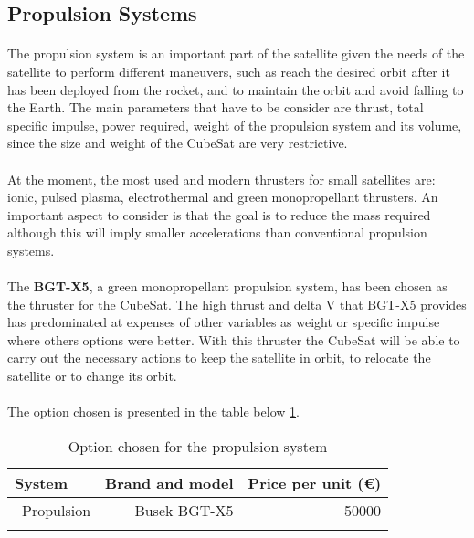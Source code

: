 \subsection{Propulsion Systems}
\paragraph{}The propulsion system is an important part of the satellite given the needs of the satellite to perform different maneuvers, such as reach the desired orbit after it has been deployed from the rocket, and to maintain the orbit and avoid falling to the Earth. The main parameters that have to be consider are thrust, total specific impulse, power required, weight of the propulsion system and its volume, since the size and weight of the CubeSat are very restrictive.

\paragraph{}At the moment, the most used and modern thrusters for small satellites are: ionic, pulsed plasma, electrothermal and green monopropellant thrusters. An important aspect to consider is that the goal is to reduce the mass required although this will imply smaller accelerations than conventional propulsion systems.

\paragraph{}The \textbf{BGT-X5}, a green monopropellant propulsion system, has been chosen as the thruster for the CubeSat. The high thrust and delta V that BGT-X5 provides has predominated at expenses of other variables as weight or specific impulse where others options were better. With this thruster the CubeSat will be able to carry out the necessary actions to keep the satellite in orbit, to relocate the satellite or to change its orbit.

\paragraph{}The option chosen is presented in the table below \ref{propulsionfinal}.

\begin{longtable}{| l | r | r | }
\hline
\rowcolor[gray]{0.80}	\textbf{System} &  \textbf{Brand and model}     & \textbf{Price per unit (\euro)}   \\
\hline
\endfirsthead

	   ~Propulsion & Busek BGT-X5 & 50000 \\
	\hline

\caption{Option chosen for the propulsion system}
\label{propulsionfinal}
\end{longtable}
